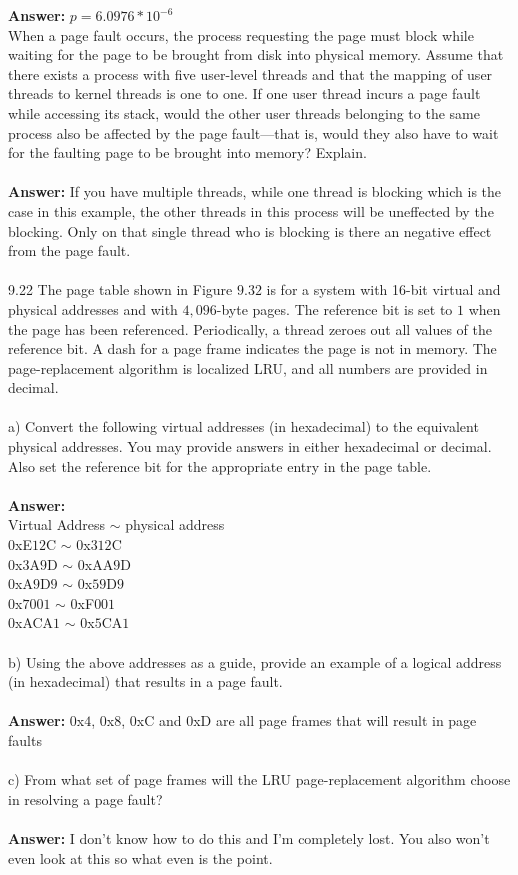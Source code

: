 \documentclass[12pt]{article}
\begin{document}
\textbf{Answer: } $p = 6.0976*10^{-6}$\\
When a page fault occurs, the process requesting the page must block
while waiting for the page to be brought from disk into physical memory.
Assume that there exists a process with five user-level threads and that
the mapping of user threads to kernel threads is one to one. If one user
thread incurs a page fault while accessing its stack, would the other
user threads belonging to the same process also be affected by the page
fault—that is, would they also have to wait for the faulting page to be
brought into memory? Explain.\\\\
\textbf{Answer: }If you have multiple threads, while one thread is blocking which is the case
in this example, the other threads in this process will be uneffected by 
the blocking.  Only on that single thread who is blocking is there an 
negative effect from the page fault.\\\\
9.22 The page table shown in Figure $9.32$ is for a system with 16-bit virtual
and physical addresses and with $4,096$-byte pages. The reference bit is
set to $1$ when the page has been referenced. Periodically, a thread zeroes
out all values of the reference bit. A dash for a page frame indicates
the page is not in memory. The page-replacement algorithm is localized
LRU, and all numbers are provided in decimal.\\\\
a) Convert the following virtual addresses (in hexadecimal) to the
equivalent physical addresses. You may provide answers in either 
hexadecimal or decimal. Also set the reference bit for the appropriate
entry in the page table.\\\\
\textbf{Answer: }\\
Virtual Address $\sim$ physical address\\
$0$xE$12$C $\sim$ $0$x$312$C\\
$0$x$3$A$9$D $\sim$ $0$xAA$9$D\\
$0$xA$9$D$9$ $\sim$ $0$x$59$D$9$\\
$0$x$7001$ $\sim$ $0$xF$001$\\
$0$xACA$1$ $\sim$ $0$x$5$CA$1$
\\\\
b) Using the above addresses as a guide, provide an example of a
logical address (in hexadecimal) that results in a page fault.\\\\
\textbf{Answer: } $0$x$4$, $0$x$8$, $0$xC and $0$xD are all page 
frames that will result in page faults
\\\\
c) From what set of page frames will the LRU page-replacement
algorithm choose in resolving a page fault?\\\\
\textbf{Answer: } I don't know how to do this and I'm completely lost.
You also won't even look at this so what even is the point.
\end{document}
